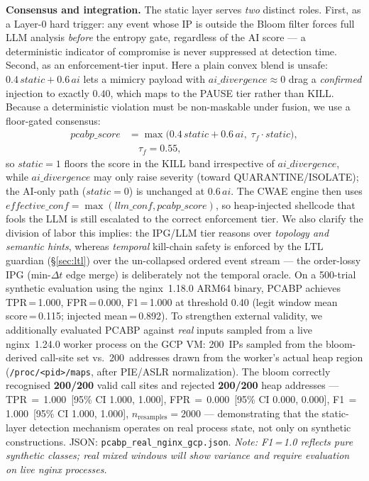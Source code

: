 \documentclass[journal]{IEEEtran}
\newcommand{\cwae}{CWAE}
\begin{document}
\noindent\textbf{Consensus and integration.}
The static layer serves \emph{two} distinct roles.  First, as a Layer-0
hard trigger: any event whose IP is outside the Bloom filter forces full
LLM analysis \emph{before} the entropy gate, regardless of the AI score ---
a deterministic indicator of compromise is never suppressed at detection
time.  Second, as an enforcement-tier input.  Here a plain convex blend is
unsafe: $0.4\,\textit{static} + 0.6\,\textit{ai}$ lets a mimicry payload
with $\textit{ai\_divergence}\!\approx\!0$ drag a \emph{confirmed} injection
to exactly $0.40$, which maps to the PAUSE tier rather than KILL.  Because a
deterministic violation must be non-maskable under fusion, we use a
floor-gated consensus:
\begin{align}
\textit{pcabp\_score} &= \max\!\bigl(0.4\,\textit{static} +
  0.6\,\textit{ai},\; \tau_{\!f}\cdot\textit{static}\bigr), \nonumber\\
&\quad \tau_{\!f} = 0.55,
\label{eq:pcabp}
\end{align}
so $\textit{static}{=}1$ floors the score in the KILL band irrespective of
$\textit{ai\_divergence}$, while $\textit{ai\_divergence}$ may only raise
severity (toward QUARANTINE/ISOLATE); the AI-only path
($\textit{static}{=}0$) is unchanged at $0.6\,\textit{ai}$.  The \cwae{}
engine then uses $\textit{effective\_conf} =
\max(\textit{llm\_conf}, \textit{pcabp\_score})$, so heap-injected shellcode
that fools the LLM is still escalated to the correct enforcement tier.
We also clarify the division of labor this implies: the IPG/LLM tier reasons
over \emph{topology and semantic hints}, whereas \emph{temporal} kill-chain
safety is enforced by the LTL guardian (\S\ref{sec:ltl}) over the
un-collapsed ordered event stream --- the order-lossy IPG
(min-$\Delta t$ edge merge) is deliberately not the temporal oracle.
On a 500-trial synthetic evaluation using the nginx~1.18.0 ARM64 binary,
PCABP achieves TPR\,=\,1.000, FPR\,=\,0.000, F1\,=\,1.000 at threshold 0.40
(legit window mean score\,=\,0.115; injected mean\,=\,0.892). To strengthen
external validity, we additionally evaluated PCABP against \emph{real} inputs
sampled from a live nginx~1.24.0 worker process on the GCP VM: 200~IPs
sampled from the bloom-derived call-site set vs.\ 200~addresses drawn from
the worker's actual heap region (\texttt{/proc/<pid>/maps}, after PIE/ASLR
normalization). The bloom correctly recognised \textbf{200/200} valid call
sites and rejected \textbf{200/200} heap addresses ---
TPR\,$=$\,1.000~[95\% CI 1.000, 1.000], FPR\,$=$\,0.000~[95\% CI 0.000, 0.000],
F1\,$=$\,1.000~[95\% CI 1.000, 1.000], $n_{\text{resamples}}{=}2000$ ---
demonstrating that the static-layer detection mechanism operates on real
process state, not only on synthetic constructions. JSON:
\texttt{pcabp\_real\_nginx\_gcp.json}.
\emph{Note: F1\,=\,1.0 reflects pure synthetic classes; real mixed windows
will show variance and require evaluation on live nginx processes.}
\end{document}
